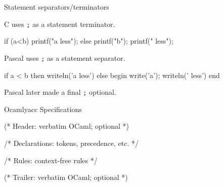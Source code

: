 \documentclass{plt}
\begin{document}
\begin{frame}[fragile]{Statement separators/terminators}

C uses \texttt{;} as a statement terminator.

\begin{C}
if (a<b)
  printf("a less");
else {
  printf("b"); printf(" less");
}
\end{C}

Pascal uses \texttt{;} as a statement separator. 

\begin{pascal}
if a < b then
  writeln('a less')
else begin
  write('a'); writeln(' less')
end
\end{pascal}

Pascal later made a final \texttt{;} optional.

\end{frame}

\begin{frame}[fragile]{Ocamlyacc Specifications}

\begin{ocamlyacc}
  (* Header: verbatim OCaml; optional *)

  /* Declarations: tokens, precedence, etc. */


  /* Rules: context-free rules */


  (* Trailer: verbatim OCaml; optional *)

\end{ocamlyacc}

\end{frame}
\end{document}
